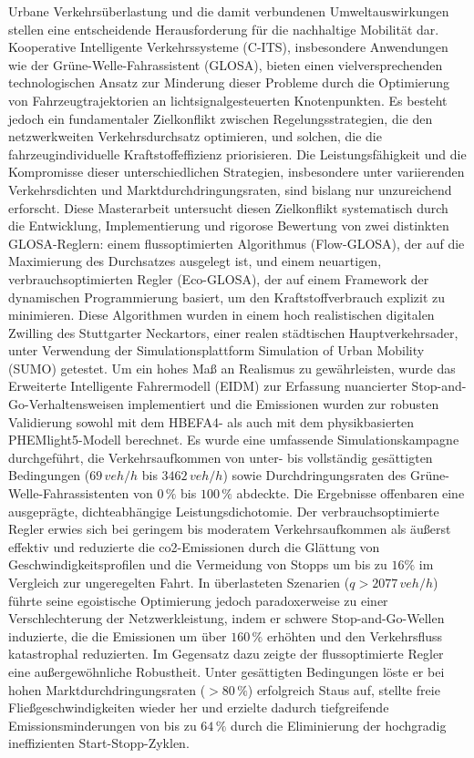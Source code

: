 Urbane Verkehrsüberlastung und die damit verbundenen Umweltauswirkungen stellen eine entscheidende Herausforderung für die nachhaltige Mobilität dar. Kooperative Intelligente Verkehrssysteme (C-ITS), insbesondere Anwendungen wie der Grüne-Welle-Fahrassistent (GLOSA), bieten einen vielversprechenden technologischen Ansatz zur Minderung dieser Probleme durch die Optimierung von Fahrzeugtrajektorien an lichtsignalgesteuerten Knotenpunkten. Es besteht jedoch ein fundamentaler Zielkonflikt zwischen Regelungsstrategien, die den netzwerkweiten Verkehrsdurchsatz optimieren, und solchen, die die fahrzeugindividuelle Kraftstoffeffizienz priorisieren. Die Leistungsfähigkeit und die Kompromisse dieser unterschiedlichen Strategien, insbesondere unter variierenden Verkehrsdichten und Marktdurchdringungsraten, sind bislang nur unzureichend erforscht.
\mynewline
Diese Masterarbeit untersucht diesen Zielkonflikt systematisch durch die Entwicklung, Implementierung und rigorose Bewertung von zwei distinkten GLOSA-Reglern: einem flussoptimierten Algorithmus (Flow-GLOSA), der auf die Maximierung des Durchsatzes ausgelegt ist, und einem neuartigen, verbrauchsoptimierten Regler (Eco-GLOSA), der auf einem Framework der dynamischen Programmierung basiert, um den Kraftstoffverbrauch explizit zu minimieren. Diese Algorithmen wurden in einem hoch realistischen digitalen Zwilling des Stuttgarter Neckartors, einer realen städtischen Hauptverkehrsader, unter Verwendung der Simulationsplattform Simulation of Urban Mobility (SUMO) getestet. Um ein hohes Maß an Realismus zu gewährleisten, wurde das Erweiterte Intelligente Fahrermodell (EIDM) zur Erfassung nuancierter Stop-and-Go-Verhaltensweisen implementiert und die Emissionen wurden zur robusten Validierung sowohl mit dem HBEFA4- als auch mit dem physikbasierten PHEMlight5-Modell berechnet. Es wurde eine umfassende Simulationskampagne durchgeführt, die Verkehrsaufkommen von unter- bis vollständig gesättigten Bedingungen ($69\,\unit{veh/h}$ bis $3462\,\unit{veh/h}$) sowie Durchdringungsraten des Grüne-Welle-Fahrassistenten von $0\,\%$ bis $100\,\%$ abdeckte.
\mynewline
Die Ergebnisse offenbaren eine ausgeprägte, dichteabhängige Leistungsdichotomie. Der verbrauchsoptimierte Regler erwies sich bei geringem bis moderatem Verkehrsaufkommen als äußerst effektiv und reduzierte die \ac{co2}-Emissionen durch die Glättung von Geschwindigkeitsprofilen und die Vermeidung von Stopps um bis zu $16\%$ im Vergleich zur ungeregelten Fahrt. In überlasteten Szenarien ($q > 2077\,\unit{veh/h}$) führte seine egoistische Optimierung jedoch paradoxerweise zu einer Verschlechterung der Netzwerkleistung, indem er schwere Stop-and-Go-Wellen induzierte, die die Emissionen um über $160\,\%$ erhöhten und den Verkehrsfluss katastrophal reduzierten. Im Gegensatz dazu zeigte der flussoptimierte Regler eine außergewöhnliche Robustheit. Unter gesättigten Bedingungen löste er bei hohen Marktdurchdringungsraten ($>80\,\%$) erfolgreich Staus auf, stellte freie Fließgeschwindigkeiten wieder her und erzielte dadurch tiefgreifende Emissionsminderungen von bis zu $64\,\%$ durch die Eliminierung der hochgradig ineffizienten Start-Stopp-Zyklen.
